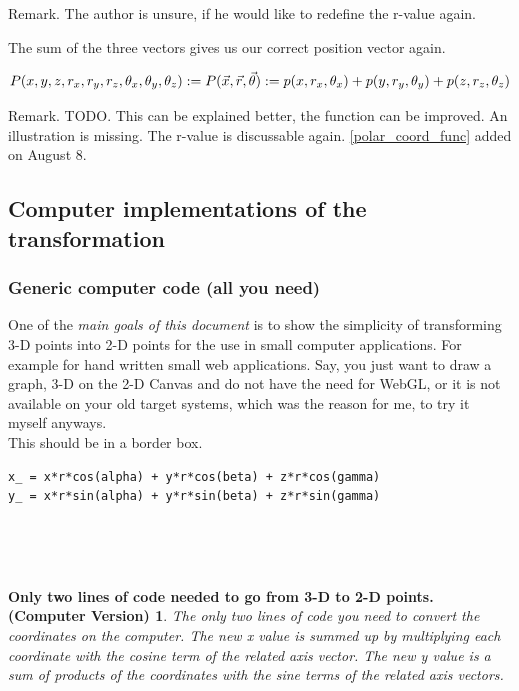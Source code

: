\documentclass[a4paper]{article}
\begin{document}
\begin{Example}
Remark. The author is unsure, if he would like to redefine the r-value again.

The sum of the three vectors gives us our correct position vector again.

\begin{displaymath}
P(x,y,z,r_x,r_y,r_z,\theta_x,\theta_y,\theta_z) :=  P(\vec{x}, \vec{r}, \vec{\theta}) := p(x, r_x, \theta_x)+p(y, r_y, \theta_y)+p(z, r_z, \theta_z)\\
\end{displaymath}

Remark. TODO. This can be explained better, the function can be improved. An illustration is missing. The r-value is discussable again. \ref{polar_coord_func} added on August 8.


\subsection{Computer implementations of the transformation}
\subsubsection{Generic computer code (all you need)}

One of the \emph{main goals of this document} is to show the simplicity of transforming 3-D points into 2-D points for the use in small computer applications. For example for hand written small web applications. Say, you just want to draw a graph, 3-D on the 
2-D Canvas and do not have the need for WebGL, or it is not available on your old target systems, which was the reason for me, to try it myself anyways.\\

This should be in a border box.\\


\begin{example}
\begin{lstlisting}
x_ = x*r*cos(alpha) + y*r*cos(beta) + z*r*cos(gamma)
y_ = x*r*sin(alpha) + y*r*sin(beta) + z*r*sin(gamma)
\end{lstlisting}\\

\end{example}\\

\newtheorem{CodeTheorem}{Only two lines of code needed to go from 3-D to 2-D points. (Computer Version)}
\begin{CodeTheorem}
The only two lines of code you need to convert the coordinates on the computer. The new x value
is summed up by multiplying each coordinate with the cosine term of the related axis vector. The new y value
is a sum of products of the coordinates with the sine terms of the related axis vectors.
\end{CodeTheorem}


\end{Example}
\end{document}
